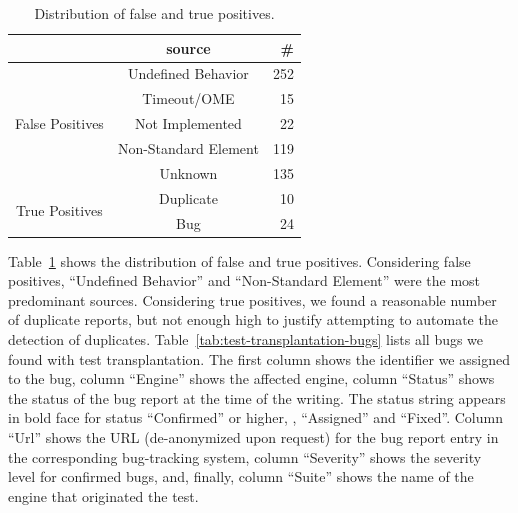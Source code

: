\documentclass[10pt,conference,anonymous]{IEEEtran}
\begin{document}

\begin{table}[t!]
  \setlength{\tabcolsep}{4pt}    
  \centering
  \caption{\label{fig:falsepositives}\label{fig:truepositives}\label{fig:piecharts-transplantation}Distribution of false and true positives.}
  \begin{tabular}{ccr}
    \toprule
    & source &  \#\\
    \midrule
    \multirow{5}{*}{False Positives} & Undefined Behavior & 252 \\
    & Timeout/OME & 15 \\
    & Not Implemented & 22 \\
    & Non-Standard Element & 119 \\
    & Unknown & 135 \\
    \midrule
    \multirow{2}{*}{True Positives} & Duplicate & 10 \\
    & Bug & 24 \\
    \bottomrule
  \end{tabular}
\end{table}






Table~\ref{fig:piecharts-transplantation} shows the distribution of
false and true positives. Considering false positives, ``Undefined
Behavior'' and ``Non-Standard Element'' were the most predominant
sources. Considering true positives, we found a reasonable number of
duplicate reports, but not enough high to justify attempting to
automate the detection of duplicates.
Table~\ref{tab:test-transplantation-bugs} lists all bugs we found with
test transplantation. The first column shows the identifier we
assigned to the bug, column ``Engine'' shows the
affected engine, column ``Status'' shows the status of the bug report
at the time of the writing. The status string appears in bold face for
status ``Confirmed'' or higher, \ie{}, ``Assigned'' and ``Fixed''.
Column ``Url'' shows the URL (de-anonymized upon request) for the bug
report entry in the corresponding bug-tracking system, column
``Severity'' shows the severity level for confirmed bugs, and,
finally, column ``Suite'' shows the name of the engine that originated
the test.
\end{document}
